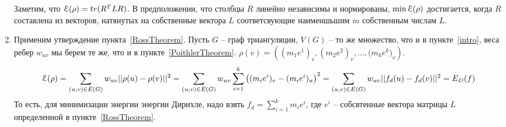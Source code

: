 \documentclass{article}
\begin{document}
\begin{enumerate}
    Заметим, что $\EuScript{E}(\rho) = tr(R^T L R)$. В предположении, что столбцы $R$ линейно независимы и нормированы, $\min{\EuScript{E}(\rho)}$ достигается, 
    когда $R$ составлена из векторов, натянутых на собственные вектора $L$ соответсвующие наименшьшим $m$ собственным числам $L$.
     
    \item Применим утверждение пункта~\ref{RossTheorem}. Пусть $G$ -- граф триангуляции, $V(G)$ -- то же множество, что и в пункте~\ref{intro}, 
    веса ребер $w_{uv}$ мы берем те же, что и в пункте~\ref{PoithlerTheorem}. $\rho(v) = \left( {(m_1 e^1)_v}, {(m_2 e^2)_v}, ..., {(m_k e^k})_v \right)$.
    $$
        \EuScript{E}(\rho) = \sum_{\left( u, v \right) \in E \left( G \right)}{w_{uv} ||\rho(u) - \rho(v)||^2} = 
        \sum_{\left( u, v \right) \in E \left( G \right)}{w_{uv} \sum_{i=1}^k{\left((m_i e^i)_v - (m_i e^i)_u \right)^2}} =
        \sum_{\left( u, v \right) \in E \left( G \right)}{w_{uv} ||f_d(u) - f_d(v)||^2} = E_D(f)
    $$
    То есть, для минимизации энергии энергии Дирихле, надо взять $f_d = \sum_{i=1}^k{m_i e^i}$, где $e^i$ -- собсвтенные вектора матрицы $L$ определенной 
    в пункте~\ref{RossTheorem}.
\end{enumerate}
\end{document}
